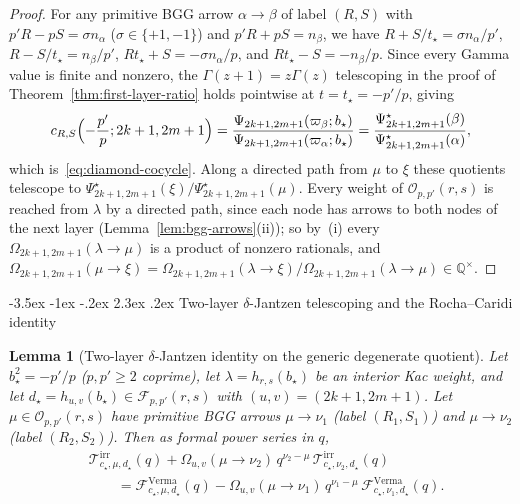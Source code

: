 \documentclass[twoside,10pt]{article}
\makeatletter
\numberwithin{equation}{section}
\theoremstyle{slbody}
\newtheorem{lemma}[theorem]{Lemma}
\theoremstyle{definition}
\theoremstyle{remark}
\renewcommand{\section}{%
  \@startsection{section}{1}{\z@}%
    {-3.5ex \@plus -1ex \@minus -.2ex}%
    {2.3ex \@plus .2ex}%
    {\normalfont\large\bfseries}}
\makeatother
\begin{document}
\begin{proof}
For any primitive BGG arrow \(\alpha\to\beta\) of label \((R,S)\) with
\(p'R-pS=\sigma n_\alpha\) (\(\sigma\in\{+1,-1\}\)) and \(p'R+pS=n_\beta\),
we have \(R+S/t_\star=\sigma n_\alpha/p'\), \(R-S/t_\star=n_\beta/p'\),
\(Rt_\star+S=-\sigma n_\alpha/p\), and \(Rt_\star-S=-n_\beta/p\).  Since
every Gamma value is finite and nonzero, the \(\Gamma(z+1)=z\Gamma(z)\)
telescoping in the proof of Theorem~\ref{thm:first-layer-ratio} holds pointwise
at \(t=t_\star=-p'/p\), giving
\begin{equation}\label{eq:arrow-is-psi-ratio}
 c_{R,S}\Bigl(-\frac{p'}{p};2k+1,2m+1\Bigr)
 =\frac{\Psi_{2k+1,2m+1}(\varpi_\beta;b_\star)}{\Psi_{2k+1,2m+1}(\varpi_\alpha;b_\star)}
 =\frac{\Psi^\star_{2k+1,2m+1}(\beta)}{\Psi^\star_{2k+1,2m+1}(\alpha)},
\end{equation}
which is~\eqref{eq:diamond-cocycle}.  Along a directed path from \(\mu\) to
\(\xi\) these quotients telescope to
\(\Psi^\star_{2k+1,2m+1}(\xi)/\Psi^\star_{2k+1,2m+1}(\mu)\).  Every weight of
\(\mathcal{O}_{p,p'}(r,s)\) is reached from \(\lambda\) by a directed path,
since each node has arrows to both nodes of the next layer
(Lemma~\ref{lem:bgg-arrows}(ii)); so by~(i) every
\(\Omega_{2k+1,2m+1}(\lambda\to\mu)\) is a product of nonzero rationals, and
\(\Omega_{2k+1,2m+1}(\mu\to\xi)
=\Omega_{2k+1,2m+1}(\lambda\to\xi)/\Omega_{2k+1,2m+1}(\lambda\to\mu)\in\mathbb Q^\times\).
\end{proof}

\section{Two-layer \texorpdfstring{\(\delta\)}{delta}-Jantzen telescoping and the Rocha--Caridi identity}\label{sec:telescoping}

\begin{lemma}[Two-layer \(\delta\)-Jantzen identity on the generic degenerate quotient]\label{lem:degenerate-quotient-t}
Let \(b_\star^2=-p'/p\) (\(p,p'\geq2\) coprime), let
\(\lambda=h_{r,s}(b_\star)\) be an interior Kac weight, and let
\(d_\star=h_{u,v}(b_\star)\in\mathcal{F}_{p,p'}(r,s)\) with
\((u,v)=(2k+1,2m+1)\).  Let \(\mu\in\mathcal{O}_{p,p'}(r,s)\) have primitive
BGG arrows \(\mu\to\nu_1\) (label \((R_1,S_1)\)) and \(\mu\to\nu_2\) (label
\((R_2,S_2)\)).  Then as formal power series in \(q\),
\begin{equation}\label{eq:two-term-id}
 \begin{aligned}
 &\mathcal{T}^{\mathrm{irr}}_{c_\star,\mu,d_\star}(q)
 +\Omega_{u,v}(\mu\to\nu_2)\,q^{\nu_2-\mu}\,
  \mathcal{T}^{\mathrm{irr}}_{c_\star,\nu_2,d_\star}(q)\\
 &\qquad=\mathcal{F}^{\mathrm{Verma}}_{c_\star,\mu,d_\star}(q)
 -\Omega_{u,v}(\mu\to\nu_1)\,q^{\nu_1-\mu}\,
  \mathcal{F}^{\mathrm{Verma}}_{c_\star,\nu_1,d_\star}(q).
 \end{aligned}
\end{equation}
\end{lemma}
\end{document}

